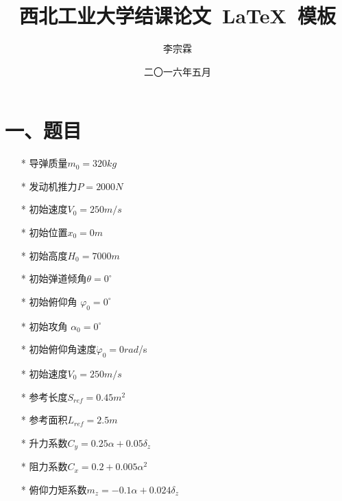 \documentclass[forprint]{NWPUBachelor}
\begin{document}
\miji{ }                                      %

\title{西北工业大学结课论文~\LaTeX~模板}
\author{李宗霖}                            %
\date{二〇一六年五月}                    %

\maketitle
\frontmatter
{}              %

\section*{ 一、题目}

\begin{itemize}
    \item[*] 导弹质量$m_0=320kg$
    \item[*] 发动机推力$P=2000N$
    \item[*] 初始速度$V_0=250m/s$
    \item[*] 初始位置$x_0=0m$
    \item[*] 初始高度$H_0=7000m$
    \item[*] 初始弹道倾角$\theta=0^{\circ}$
    \item[*] 初始俯仰角 $\varphi_0=0^\circ$
    \item[*] 初始攻角 $\alpha_0=0^\circ$
    \item[*] 初始俯仰角速度$\dot{\varphi}_0=0rad$/s
    \item[*] 初始速度$V_0=250m/s$
    \item[*] 参考长度$S_{ref}=0.45 m^{2}$
    \item[*] 参考面积$L_{ref}=2.5m$
    \item[*] 升力系数$C_{y}=0.25\alpha+0.05\delta_{z}$
    \item[*] 阻力系数$C_x=0.2+0.005\alpha^2$
    \item[*] 俯仰力矩系数$m_z=-0.1\alpha+0.024\delta_z$
\end{itemize}
\end{document}
